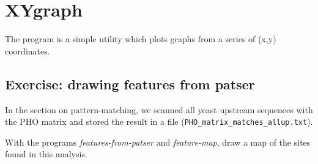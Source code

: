 \section{XYgraph}

The program  is a simple utility which plots graphs
from a series of (x,y) coordinates.

\subsection{Exercise: drawing features from patser}

In the section on pattern-matching, we scanned all yeast upstream
sequences with the PHO matrix and stored the result in a file
(\texttt{PHO\_matrix\_matches\_allup.txt}).

With the programs \textit{features-from-patser} and
\textit{feature-map}, draw a map of the sites found in this analysis.
